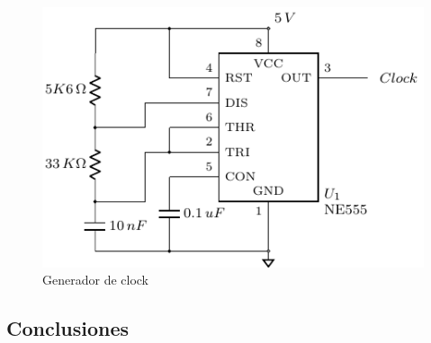 \begin{figure}[H]
\centering
\includegraphics[scale=0.8]{Ejercicio8/Circuitos/Clock.pdf}
\caption{Generador de clock}
\label{fig:Clock}
\end{figure}







\subsection{Conclusiones}
